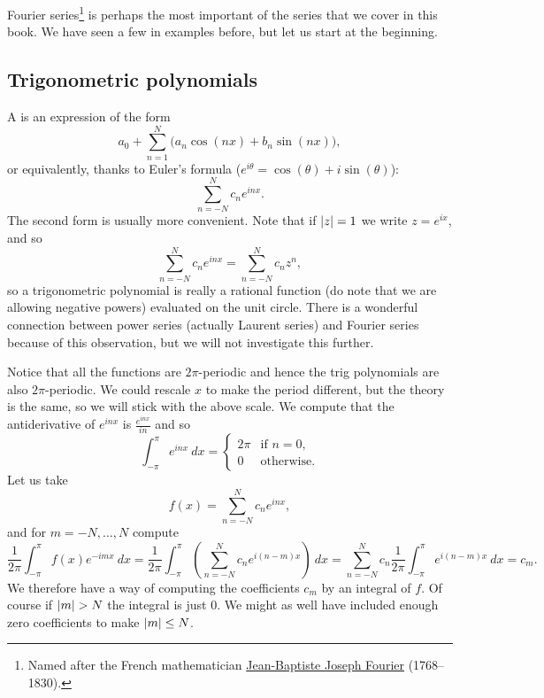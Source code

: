 Fourier series\footnote{%
Named after the French mathematician
\href{http://en.wikipedia.org/wiki/Joseph_Fourier}{Jean-Baptiste Joseph Fourier}
(1768--1830).} is perhaps the most important of the series that we cover in
this book.  We have seen a few in examples before, but let us start
at the beginning.

\subsection{Trigonometric polynomials}

A \emph{} is an expression of the form
\begin{equation*}
a_0 + \sum_{n=1}^N \bigl(a_n \cos(nx) + b_n \sin(nx) \bigr),
\end{equation*}
or equivalently, thanks to Euler's formula ($e^{i\theta} = \cos(\theta) + i
\sin(\theta)$):
\begin{equation*}
\sum_{n=-N}^N c_n e^{inx} .
\end{equation*}
The second form is usually more convenient.  Note that if
$\lvert {z} \rvert=1$ we write $z = e^{ix}$, and so
\begin{equation*}
\sum_{n=-N}^N c_n e^{inx} = 
\sum_{n=-N}^N c_n z^n ,
\end{equation*}
so a trigonometric polynomial is really a rational function (do note that
we are allowing negative powers) evaluated on the unit circle.  There is
a wonderful connection between power series (actually Laurent series) and
Fourier series because of this observation,
but we will not investigate this further.

Notice that all the functions are $2\pi$-periodic and hence the trig
polynomials are also $2\pi$-periodic.
We could rescale $x$ to make the period different, but the theory is the
same, so we will stick with the above scale.
We compute that the antiderivative of $e^{inx}$ is $\frac{e^{inx}}{in}$ and
so
\begin{equation*}
\int_{-\pi}^\pi e^{inx} ~ dx =
\begin{cases}
2\pi & \text{if $n=0$,} \\
0 & \text{otherwise.}
\end{cases}
\end{equation*}
Let us take
\begin{equation*}
f(x) = \sum_{n=-N}^N c_n e^{inx} ,
\end{equation*}
and for $m=-N,\ldots,N$ compute
\begin{equation*}
\frac{1}{2\pi} \int_{-\pi}^\pi
f(x) e^{-imx} ~ dx
=
\frac{1}{2\pi} \int_{-\pi}^\pi
\left(\sum_{n=-N}^N c_n e^{i(n-m)x}\right) ~ dx
=
\sum_{n=-N}^N
c_n
\frac{1}{2\pi}
\int_{-\pi}^\pi
e^{i(n-m)x}
 ~ dx
=
c_m .
\end{equation*}
We therefore have a way of computing the coefficients $c_m$ by an integral
of $f$.  Of course if $\lvert {m} \rvert > N$ the integral is just 0.  We might as
well have included enough zero coefficients to make $\lvert {m} \rvert \leq N$.

